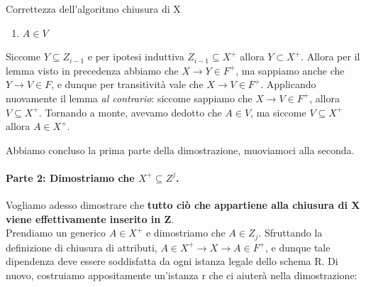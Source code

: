 \documentclass[12pt]{report}
\newcommand{\ra}{
	\rightarrow
}
\begin{document}
\begin{dimostrazione}{Correttezza dell'algoritmo chiusura di X}{}
\begin{itemize}
\begin{enumerate}
				\item $A \in V$
			\end{enumerate}
			Siccome $Y \subseteq Z_{i-1}$ e per ipotesi induttiva $Z_{i-1} \subseteq X^+$ allora $Y \subset X^+$. Allora per il lemma visto in precedenza abbiamo che $X \ra Y \in F^+$, ma sappiamo anche che $Y \ra V \in F$, e dunque per transitività vale che $X \ra V \in F^+$. Applicando nuovamente il lemma \textit{al contrario}: siccome sappiamo che $X \ra V \in F^+$, allora $V \subseteq X^+$. Tornando a monte, avevamo dedotto che $A \in V$, ma siccome $V \subseteq X^+$ allora $A \in X^+$.
		\end{itemize}
		Abbiamo concluso la prima parte della dimostrazione, muoviamoci alla seconda.
		
		\paragraph{Parte 2: Dimostriamo che $X^+ \subseteq Z^j$.} Vogliamo adesso dimostrare che \textbf{tutto ciò che appartiene alla chiusura di X viene effettivamente inserito in Z}.\\
		Prendiamo un generico $A \in X^+$ e dimostriamo che $A \in Z_j$. Sfruttando la definizione di chiusura di attributi, $A \in X^+ \ra X \ra A \in F^+$, e dunque tale dipendenza deve essere soddisfatta da ogni istanza legale dello schema R. Di nuovo, costruiamo appositamente un'istanza r che ci aiuterà nella dimostrazione:
		\begin{center}
\end{center}
\end{dimostrazione}
\end{document}
